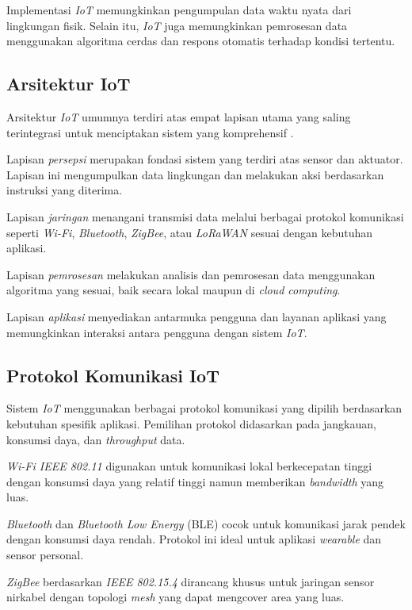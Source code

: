 Implementasi \textit{IoT} memungkinkan pengumpulan data waktu nyata dari lingkungan fisik. Selain itu, \textit{IoT} juga memungkinkan pemrosesan data menggunakan algoritma cerdas dan respons otomatis terhadap kondisi tertentu.

\subsection{Arsitektur IoT}
Arsitektur \textit{IoT} umumnya terdiri atas empat lapisan utama yang saling terintegrasi untuk menciptakan sistem yang komprehensif \citep{weber2010governance}. 

Lapisan \textit{persepsi} merupakan fondasi sistem yang terdiri atas sensor dan aktuator. Lapisan ini mengumpulkan data lingkungan dan melakukan aksi berdasarkan instruksi yang diterima. 

Lapisan \textit{jaringan} menangani transmisi data melalui berbagai protokol komunikasi seperti \textit{Wi-Fi}, \textit{Bluetooth}, \textit{ZigBee}, atau \textit{LoRaWAN} sesuai dengan kebutuhan aplikasi. 

Lapisan \textit{pemrosesan} melakukan analisis dan pemrosesan data menggunakan algoritma yang sesuai, baik secara lokal maupun di \textit{cloud computing}. 

Lapisan \textit{aplikasi} menyediakan antarmuka pengguna dan layanan aplikasi yang memungkinkan interaksi antara pengguna dengan sistem \textit{IoT}.

\subsection{Protokol Komunikasi IoT}
Sistem \textit{IoT} menggunakan berbagai protokol komunikasi yang dipilih berdasarkan kebutuhan spesifik aplikasi. Pemilihan protokol didasarkan pada jangkauan, konsumsi daya, dan \textit{throughput} data. 

\textit{Wi-Fi IEEE 802.11} digunakan untuk komunikasi lokal berkecepatan tinggi dengan konsumsi daya yang relatif tinggi namun memberikan \textit{bandwidth} yang luas. 

\textit{Bluetooth} dan \textit{Bluetooth Low Energy} (BLE) cocok untuk komunikasi jarak pendek dengan konsumsi daya rendah. Protokol ini ideal untuk aplikasi \textit{wearable} dan sensor personal. 

\textit{ZigBee} berdasarkan \textit{IEEE 802.15.4} dirancang khusus untuk jaringan sensor nirkabel dengan topologi \textit{mesh} yang dapat mengcover area yang luas. 

